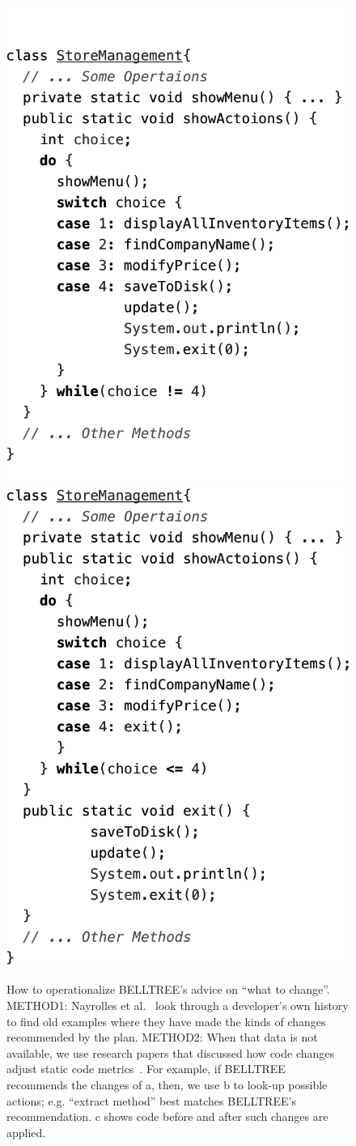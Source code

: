 \begin{figure}
{\begin{minipage}{3.5in}
\includegraphics[width=0.5\linewidth]{figs/1.png}\includegraphics[width=0.5\linewidth]{figs/2.png}
\end{minipage}
}
\caption{ How to  operationalize BELLTREE's advice on ``what to change''. 
METHOD1: Nayrolles et al.~\cite{nayrolles2018clever} 
look through a
developer's own history to find old examples where they have made the kinds of changes recommended by the plan. 
METHOD2: When that data is not available, we use  research papers that
discussed how code changes adjust
static code metrics~\cite{stroggylos2007, du2006study, kataoka2002, bryton2009, elish2011, elish2012}.
For example,  if BELLTREE   recommends the changes of a, then, we use b  to look-up possible actions;
e.g.   ``extract method'' best matches BELLTREE's recommendation.  c shows code before and after
such changes are applied.}\label{fig:motivating_example}
\end{figure}


